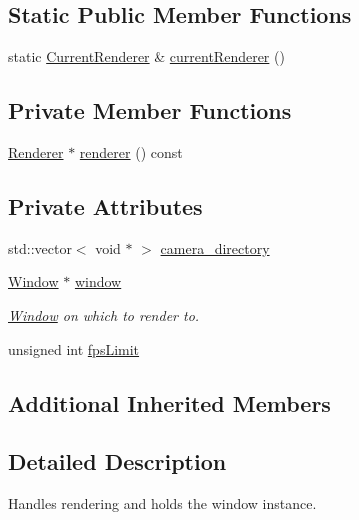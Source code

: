 \subsection*{Static Public Member Functions}
\begin{DoxyCompactItemize}
\item 
static \hyperlink{namespacepcs_ad2936e1e1cc9e4a344e2e90394d38ea2}{Current\+Renderer} \& \hyperlink{classpcs_1_1Engine_a1d7243c13d74af4d40b280201ff1feff}{current\+Renderer} ()
\end{DoxyCompactItemize}
\subsection*{Private Member Functions}
\begin{DoxyCompactItemize}
\item 
\hyperlink{classpcs_1_1Renderer}{Renderer} $\ast$ \hyperlink{classpcs_1_1Engine_a232555b38ee9ac84fdf1054de98409e9}{renderer} () const
\end{DoxyCompactItemize}
\subsection*{Private Attributes}
\begin{DoxyCompactItemize}
\item 
std\+::vector$<$ void $\ast$ $>$ \hyperlink{classpcs_1_1Engine_ad004e5859bca9815210a0f3786b83a02}{camera\+\_\+directory}
\item 
\hyperlink{classpcs_1_1Window}{Window} $\ast$ \hyperlink{classpcs_1_1Engine_a9d6dcbb93509389d86beb46ba33371a1}{window}
\begin{DoxyCompactList}\small\item\em \hyperlink{classpcs_1_1Window}{Window} on which to render to. \end{DoxyCompactList}\item 
unsigned int \hyperlink{classpcs_1_1Engine_af8b3a08a4fb036488acd2bef928e7c16}{fps\+Limit}
\end{DoxyCompactItemize}
\subsection*{Additional Inherited Members}


\subsection{Detailed Description}
Handles rendering and holds the window instance. 

